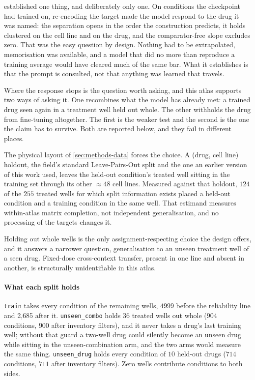  established one thing, and deliberately only one. On
conditions the checkpoint had trained on, re-encoding the target made the model
respond to the drug it was named: the separation opens in the order the
construction predicts, it holds clustered on the cell line and on the drug, and
the comparator-free slope excludes zero. That was the easy question by design.
Nothing had to be extrapolated, memorisation was available, and a model that did
no more than reproduce a training average would have cleared much of the same bar.
What it establishes is that the prompt is consulted, not that anything was learned
that travels.

Where the response stops is the question worth asking, and this atlas supports two
ways of asking it. One recombines what the model has already met: a trained drug
seen again in a treatment well held out whole. The other withholds the drug from
fine-tuning altogether. The first is the weaker test and the second is the one the
claim has to survive. Both are reported below, and they fail in different places.

The physical layout of \cref{sec:methods-data} forces the choice. A (drug, cell
line) holdout, the field's standard Leave-Pairs-Out split and the one an earlier
version of this work used, leaves the held-out condition's treated well sitting
in the training set through its other $\approx 48$ cell lines. Measured against
that holdout, $\num{124}$ of the $\num{255}$ treated wells for which split
information exists placed a held-out condition and a training condition in the
same well. That estimand measures within-atlas matrix completion, not independent
generalisation, and no processing of the targets changes it.

Holding out whole wells is the only assignment-respecting choice the design
offers, and it answers a narrower question, generalisation to an unseen treatment
well of a seen drug. Fixed-dose cross-context transfer, present in one line and
absent in another, is structurally unidentifiable in this atlas.

\paragraph{What each split holds} \texttt{train} takes every condition of the
remaining wells, $\num{4999}$ before the reliability line and 2,685
after it.
\texttt{unseen\_combo} holds $\num{36}$ treated wells out whole ($\num{904}$
conditions, $\num{900}$ after inventory filters), and it never takes a drug's
last training well; without that guard a two-well drug could silently become an
unseen drug while sitting in the unseen-combination arm, and the two arms would
measure the same thing. \texttt{unseen\_drug} holds every condition of
$\num{10}$ held-out drugs ($\num{714}$ conditions, $\num{711}$ after inventory
filters). Zero wells contribute conditions to both sides.

